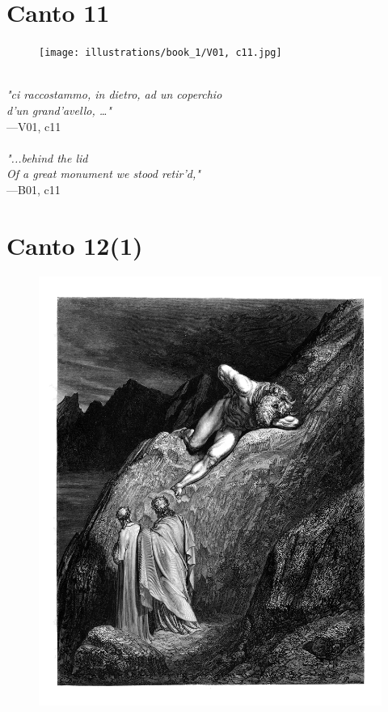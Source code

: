 \documentclass[../Dore_vision.tex]{subfiles}
\begin{document}
\newpage

\section{Canto 11}

\begin{figure}[ht]
\centering
\texttt{[image: illustrations/book\_1/V01, c11.jpg]}
\end{figure}

\begin{center}
\begin{minipage}{0.8\linewidth}
\textit{\\
"ci raccostammo, in dietro, ad un coperchio\\d’un grand’avello, …"} \\
—V01, c11 \\~\\
\textit{"...behind the lid\\Of a great monument we stood retir'd,"} \\
—B01, c11
\end{minipage}
\end{center}

\newpage

\section{Canto 12(1)}

\begin{figure}[ht]
\centering
\includegraphics[height=\figsize]{illustrations/book_1/V01, c12(1).jpg}
\end{figure}
\end{document}
